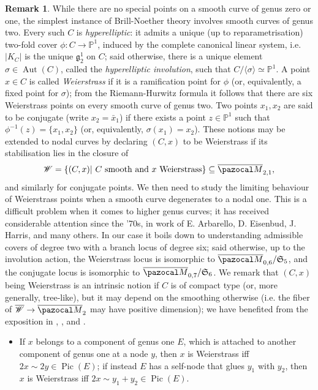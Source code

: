 \documentclass[11pt]{amsart}
\newcommand{\PP}{\mathbb P}
\renewcommand{\to}{\rightarrow}
\newcommand{\oM}{\overline{\pazocal M}}
\newcommand{\Pic}{\operatorname{Pic}}
\newcommand{\Aut}{\operatorname{Aut}}
\theoremstyle{plain}
\theoremstyle{definition}
\newtheorem{rem}[thm]{Remark}
\begin{document}
\begin{rem}\label{rmk:Wandconj}
 While there are no special points on a smooth curve of genus zero or one, the simplest instance of Brill-Noether theory involves smooth curves of genus two. Every such $C$ is \emph{hyperelliptic}: it admits a unique (up to reparametrisation) two-fold cover $\phi\colon C\to\PP^1$, induced by the complete canonical linear system, i.e. $\lvert K_C\rvert$ is the unique $\mathfrak g^1_2$ on $C$; said otherwise, there is a unique element $\sigma\in\Aut(C)$, called the \emph{hyperelliptic involution}, such that $C/\langle\sigma\rangle\simeq\PP^1$. A point $x\in C$ is called \emph{Weierstrass} if it is a ramification point for $\phi$ (or, equivalently, a fixed point for $\sigma$); from the Riemann-Hurwitz formula it follows that there are six Weierstrass points on every smooth curve of genus two. Two points $x_1,x_2$ are said to be conjugate (write $x_2=\bar x_1$) if there exists a point $z\in\PP^1$ such that $\phi^{-1}(z)=\{x_1,x_2\}$ (or, equivalently, $\sigma(x_1)=x_2$). These notions may be extended to nodal curves by declaring $(C,x)$ to be Weierstrass if its stabilisation lies in the closure of
 \[\mathcal W=\{(C,x)|\ C\text{ smooth and } x \text{ Weierstrass}\}\subseteq\oM_{2,1},\]
 and similarly for conjugate points. We then need to study the limiting behaviour of Weierstrass points when a smooth curve degenerates to a nodal one. This is a difficult problem when it comes to higher genus curves; it has received considerable attention since the '70s, in work of E. Arbarello, D. Eisenbud, J. Harris, and many others. In our case it boils down to understanding admissible covers \cite{HarrisMumford} of degree two with a branch locus of degree six; said otherwise, up to the involution action, the Weierstrass locus is isomorphic to $\oM_{0,6}/\mathfrak S_5$, and the conjugate locus is isomorphic to  $\oM_{0,7}/\mathfrak S_6$. We remark that $(C,x)$ being Weierstrass is an intrinsic notion if $C$ is of compact type (or, more generally, tree-like), but it may depend on the smoothing otherwise (i.e. the fiber of $\overline{\mathcal W}\to\oM_2$ may have positive dimension); we have benefited from the exposition in \cite[Appendix 2]{Diaz}, \cite[Proposition (3.0.6)]{Cukierman}, and \cite[Theorem 5.45]{HM}.
 \begin{itemize}[leftmargin=.5cm]
  \item If $x$ belongs to a component of genus one $E$, which is attached to another component of genus one at a node $y$, then $x$ is Weierstrass iff $2x\sim 2y\in\Pic(E)$; if instead $E$ has a self-node that glues $y_1$ with $y_2$, then $x$ is Weierstrass iff $2x\sim y_1+y_2\in\Pic(E)$.
  

\end{itemize}
\end{rem}
\end{document}
